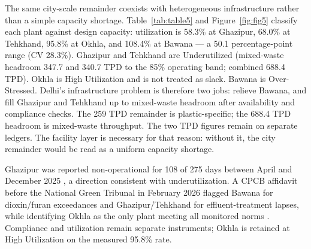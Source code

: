 \documentclass[12pt,a4paper]{article}
\begin{document}
The same city-scale remainder coexists with heterogeneous infrastructure rather than a simple capacity shortage. Table~\ref{tab:table5} and Figure~\ref{fig:fig5} classify each plant against design capacity: utilization is 58.3\% at Ghazipur, 68.0\% at Tehkhand, 95.8\% at Okhla, and 108.4\% at Bawana --- a 50.1 percentage-point range (CV 28.3\%). Ghazipur and Tehkhand are Underutilized (mixed-waste headroom 347.7 and 340.7 TPD to the 85\% operating band; combined 688.4 TPD). Okhla is High Utilization and is not treated as slack. Bawana is Over-Stressed. Delhi's infrastructure problem is therefore two jobs: relieve Bawana, and fill Ghazipur and Tehkhand up to mixed-waste headroom after availability and compliance checks. The 259 TPD remainder is plastic-specific; the 688.4 TPD headroom is mixed-waste throughput. The two TPD figures remain on separate ledgers. The facility layer is necessary for that reason: without it, the city remainder would be read as a uniform capacity shortage.

Ghazipur was reported non-operational for 108 of 275 days between April and December 2025 \citep{ht_ghazipur_shutdown_2026}, a direction consistent with underutilization. A CPCB affidavit before the National Green Tribunal in February 2026 flagged Bawana for dioxin/furan exceedances and Ghazipur/Tehkhand for effluent-treatment lapses, while identifying Okhla as the only plant meeting all monitored norms \citep{ht_cpcb_affidavit_2026}. Compliance and utilization remain separate instruments; Okhla is retained at High Utilization on the measured 95.8\% rate.
\end{document}
